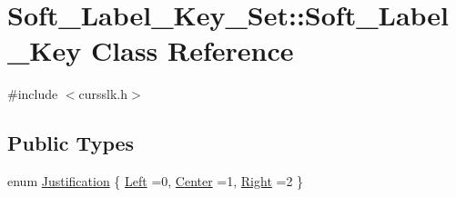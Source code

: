 \hypertarget{class_soft___label___key___set_1_1_soft___label___key}{\section{Soft\-\_\-\-Label\-\_\-\-Key\-\_\-\-Set\-:\-:Soft\-\_\-\-Label\-\_\-\-Key Class Reference}
\label{class_soft___label___key___set_1_1_soft___label___key}
}


{\ttfamily \#include $<$cursslk.\-h$>$}

\subsection*{Public Types}
\begin{DoxyCompactItemize}
\item 
enum \hyperlink{class_soft___label___key___set_1_1_soft___label___key_ad442d6280d079b66e77d86cfa387eb54}{Justification} \{ \hyperlink{class_soft___label___key___set_1_1_soft___label___key_ad442d6280d079b66e77d86cfa387eb54a2a91f9cfc159d2ed9256b27599bb7f27}{Left} =0, 
\hyperlink{class_soft___label___key___set_1_1_soft___label___key_ad442d6280d079b66e77d86cfa387eb54a247173cb4ee5b5e55709441c2f2ed76b}{Center} =1, 
\hyperlink{class_soft___label___key___set_1_1_soft___label___key_ad442d6280d079b66e77d86cfa387eb54afad813d162625fc15312a936755e346b}{Right} =2
 \}
\end{DoxyCompactItemize}
